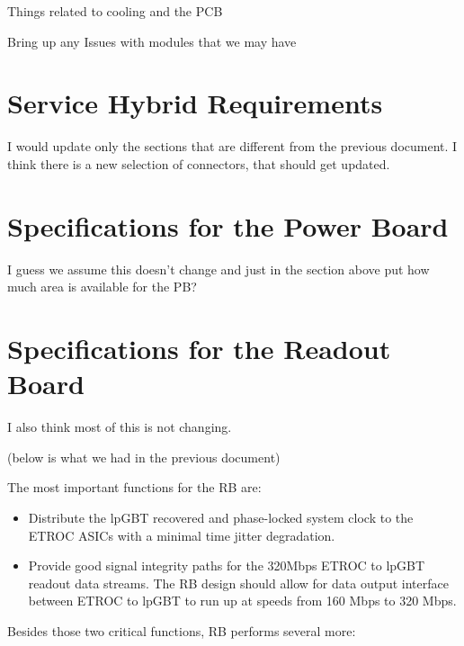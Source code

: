 \documentclass[11pt]{article}
\begin{document}
Things related to cooling and the PCB

Bring up any Issues with modules that we may have

\section{Service Hybrid Requirements}

I would update only the sections that are different from the previous
document. I think there is a new selection of connectors, that should
get updated.

\section{Specifications for the Power Board}

I guess we assume this doesn't change and just in the section above put how much area is available for the PB?

\section{Specifications for the Readout Board}

I also think most of this is not changing.

(below is what we had in the previous document)

The most important functions for the RB are:

\begin{itemize}
  \item Distribute the lpGBT recovered and phase-locked system clock to the ETROC ASICs with a minimal time jitter degradation.
  \item Provide good signal integrity paths for the 320Mbps ETROC to lpGBT readout data streams. The RB design should allow for data output interface between ETROC to lpGBT to run up at speeds from 160 Mbps to
    320 Mbps.
\end{itemize}

Besides those two critical functions, RB performs several more:
\end{document}
